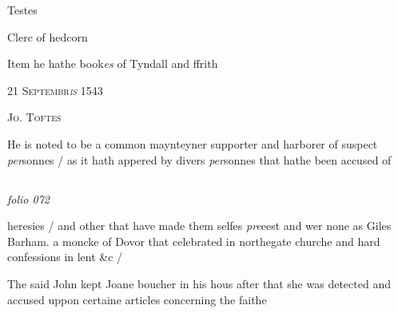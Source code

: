 \documentclass[12pt, a4paper]{book}
\begin{document}
	
		\ifthenelse{\isodd{\thepage}}
		{\reversemarginpar}
		{\normalmarginpar}
		Testes
	
		\ifthenelse{\isodd{\thepage}}
		{\reversemarginpar}
		{\normalmarginpar}
		Clerc of hedcorn
	


		\ifthenelse{\isodd{\thepage}}
		{\reversemarginpar}
		{\normalmarginpar}
		Item he hathe book\textit{es} of Tyndall and ffrith
 

            
            
               
				\begin{center} \begin{large} {\scshape 
                  21 Septembr\textit{is} 1543
               } \end{large} \end{center}
			
               
               	
				\begin{center}  {\scshape Jo. Toftes}  \end{center}
			

               	
	
		\ifthenelse{\isodd{\thepage}}
		{\reversemarginpar}
		{\normalmarginpar}
		He is noted to be a common maynteyner supporter and
 harborer of suspect \textit{per}sonnes / as it hath appered
 by divers \textit{per}sonnes that hathe been accused of
               	



\dotfill
						\newpage {} \subsection*{}  \subsection*{}

\textit{folio 072}



		\ifthenelse{\isodd{\thepage}}
		{\reversemarginpar}
		{\normalmarginpar}
		heresies / and other that have made them selfes \textit{pre}eest
 and wer none as Giles Barham. a moncke of
 	Dovor that celebrated in northegate churche and
 hard confessions in lent \&c /
	
		\ifthenelse{\isodd{\thepage}}
		{\reversemarginpar}
		{\normalmarginpar}
		The said John kept Joane boucher in his hous
 after that she was detected and accused uppon
 certaine articles concerning the faithe
	
\end{document}
